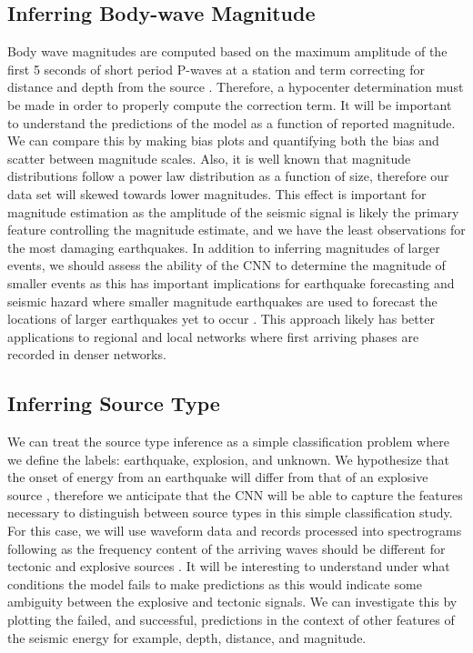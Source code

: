 \documentclass[12p]{article}
\begin{document}
\subsection{Inferring Body-wave Magnitude}
Body wave magnitudes are computed based on the maximum amplitude of the first 5 seconds of short period P-waves at a
station and term correcting for distance and depth from the source \citep{Gutenberg1945, Scordillis2006}. Therefore, a
hypocenter determination must be made in order to properly compute the correction term. It will be important to
understand the predictions of the model as a function of reported magnitude. We can compare this by making bias plots
and quantifying both the bias and scatter between magnitude scales. Also, it is well known that magnitude distributions
follow a power law distribution as a function of size, therefore our data set will skewed towards lower magnitudes. This
effect is important for magnitude estimation as the amplitude of the seismic signal is likely the primary feature
controlling the magnitude estimate, and we have the least observations for the most damaging earthquakes. In addition to
inferring magnitudes of larger events, we should assess the ability of the CNN to determine the magnitude of smaller
events as this has important implications for earthquake forecasting and seismic hazard where smaller magnitude
earthquakes are used to forecast the locations of larger earthquakes yet to occur \citep{Werner2011}. This approach
likely has better applications to regional and local networks where first arriving phases are recorded in denser
networks.

\subsection{Inferring Source Type}
We can treat the source type inference as a simple classification problem where we define the labels: earthquake,
explosion, and unknown. We hypothesize that the onset of energy from an earthquake will differ from that of an explosive
source \cite{Evernden1969, Douglas2002}, therefore we anticipate that the CNN will be able to capture the features
necessary to distinguish between source types in this simple classification study. For this case, we will use waveform
data and records processed into spectrograms following \citet{Zhu2019b} as the frequency content of the arriving waves
should be different for tectonic and explosive sources \citep{Evernden1969}. It will be interesting to understand under what conditions the model fails to make predictions as this would indicate some ambiguity between the explosive and tectonic signals. We can investigate this by plotting the failed, and successful, predictions in the context of other features of the seismic energy for example, depth, distance, and magnitude.
\end{document}

